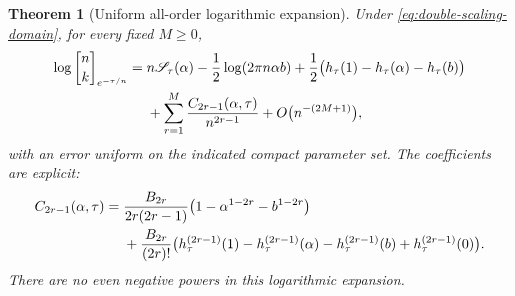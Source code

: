 \documentclass[11pt,a4paper]{article}
\numberwithin{equation}{section}
\newtheorem{theorem}{Theorem}[section]
\theoremstyle{definition}
\theoremstyle{remark}
\newcommand{\Gb}[3]{\genfrac{[}{]}{0pt}{}{#1}{#2}_{#3}}
\begin{document}
\begin{theorem}[Uniform all-order logarithmic expansion]
Under \cref{eq:double-scaling-domain}, for every fixed $M\ge0$,
\begin{align}
 \log\Gb nk{e^{-\tau/n}}
 ={}&n\mathscr S_\tau(\alpha)-\frac12\log(2\pi n\alpha b)
       +\frac12\bigl(h_\tau(1)-h_\tau(\alpha)-h_\tau(b)\bigr)
       \notag\\
 &+\sum_{r=1}^M\frac{C_{2r-1}(\alpha,\tau)}{n^{2r-1}}
       +O\bigl(n^{-(2M+1)}\bigr),
 \label{eq:double-scaling-log}
\end{align}
with an error uniform on the indicated compact parameter set. The
coefficients are explicit:
\begin{align}
 C_{2r-1}(\alpha,\tau)
 ={}&\frac{B_{2r}}{2r(2r-1)}
            \bigl(1-\alpha^{1-2r}-b^{1-2r}\bigr) \notag\\
 &+\frac{B_{2r}}{(2r)!}
  \bigl(h_\tau^{(2r-1)}(1)-h_\tau^{(2r-1)}(\alpha)
       -h_\tau^{(2r-1)}(b)+h_\tau^{(2r-1)}(0)\bigr).
 \label{eq:double-scaling-C}
\end{align}
There are no even negative powers in this logarithmic expansion.
\end{theorem}
\end{document}
